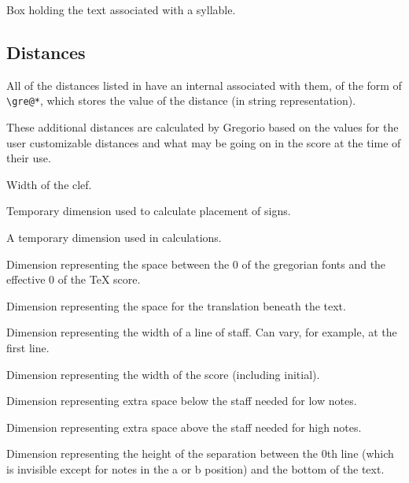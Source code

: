 Box holding the text associated with a syllable.



\subsection{Distances}
All of the distances listed in  have an internal
associated with them, of the form of \verb=\gre@*=, which stores the value of the distance (in
string representation).

These additional distances are calculated by Gregorio based on the values for the user customizable distances and what may be going on in the score at the time of their use.

Width of the clef.

Temporary dimension used to calculate placement of signs.

A temporary dimension used in calculations.

Dimension representing the space between the 0 of the gregorian fonts and the effective 0 of the TeX score.

Dimension representing the space for the translation beneath the text.

Dimension representing the width of a line of staff.  Can vary, for
example, at the first line.

Dimension representing the width of the score (including initial).

Dimension representing extra space below the staff needed for low notes.

Dimension representing extra space above the staff needed for high notes.

Dimension representing the height of the separation between the 0th
line (which is invisible except for notes in the a or b position) and
the bottom of the text.

